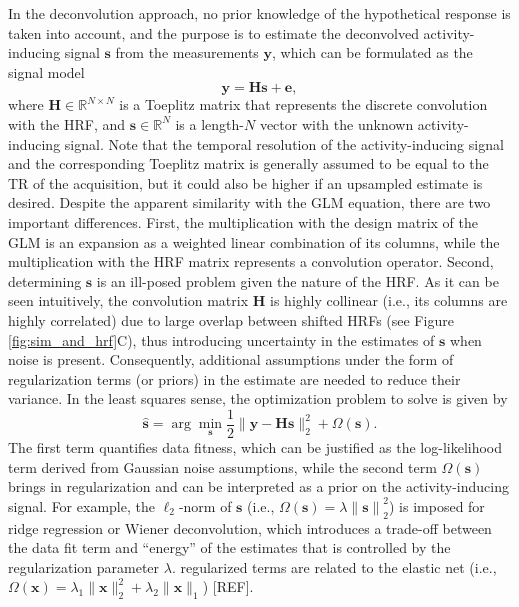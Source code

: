 In the deconvolution approach, no prior knowledge of the hypothetical response
is taken into account, and the purpose is to estimate the deconvolved
activity-inducing signal $\mathbf{s}$ from the measurements $\mathbf{y}$, which
can be formulated as the signal model
\begin{equation}
    \label{eq:synthesis_model}
    \mathbf{y} = \mathbf{Hs} + \mathbf{e},
\end{equation}
where $\mathbf{H} \in \mathbb{R}^{N \times N}$ is a Toeplitz matrix that
represents the discrete convolution with the HRF, and $\mathbf{s} \in
\mathbb{R}^{N}$ is a length-$N$ vector with the unknown activity-inducing
signal. Note that the temporal resolution of the activity-inducing signal and
the corresponding Toeplitz matrix is generally assumed to be equal to the TR of
the acquisition, but it could also be higher if an upsampled estimate is
desired. Despite the apparent similarity with the GLM equation, there are two
important differences. First, the multiplication with the design matrix of the
GLM is an expansion as a weighted linear combination of its columns, while the
multiplication with the HRF matrix represents a convolution operator. Second,
determining $\mathbf{s}$ is an ill-posed problem given the nature of the HRF. As
it can be seen intuitively, the convolution matrix $\mathbf{H}$ is highly
collinear (i.e., its columns are highly correlated) due to large overlap between
shifted HRFs (see Figure \ref{fig:sim_and_hrf}C), thus introducing uncertainty
in the estimates of $\mathbf{s}$ when noise is present. Consequently, additional
assumptions under the form of regularization terms (or priors) in the estimate
are needed to reduce their variance. In the least squares sense, the
optimization problem to solve is given by 
\begin{equation}
    \label{eq:regularized_least_squares}
    \hat{\mathbf{s}} = \arg \min_{\mathbf{s}} \frac{1}{2} \| \mathbf{y} - \mathbf{Hs} \|_2^2 + \Omega(\mathbf{s}).
\end{equation}
The first term quantifies data fitness, which can be justified as the
log-likelihood term derived from Gaussian noise assumptions, while the second
term \(\Omega(\mathbf{s})\) brings in regularization and can be interpreted as a
prior on the activity-inducing signal. For example, the $\ell_2$-norm of
$\mathbf{s}$ (i.e., $\Omega(\mathbf{s})=\lambda \left\| \mathbf{s}\right\|_2^2$)
is imposed for ridge regression or Wiener deconvolution, which introduces a
trade-off between the data fit term and ``energy'' of the estimates that is
controlled by the regularization parameter $\lambda$. %
regularized terms are related to the elastic net (i.e.,
$\Omega(\mathbf{x})=\lambda_1\|\mathbf{x}\|_2^2 + \lambda_2\|\mathbf{x}\|_1$)
[REF]. 

